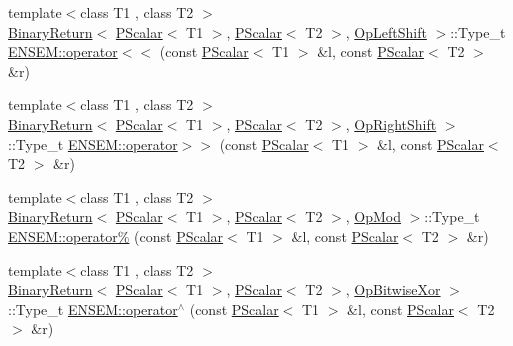 \begin{DoxyCompactItemize}
\item 
{\footnotesize template$<$class T1 , class T2 $>$ }\\\mbox{\hyperlink{structENSEM_1_1BinaryReturn}{Binary\+Return}}$<$ \mbox{\hyperlink{classENSEM_1_1PScalar}{P\+Scalar}}$<$ T1 $>$, \mbox{\hyperlink{classENSEM_1_1PScalar}{P\+Scalar}}$<$ T2 $>$, \mbox{\hyperlink{structENSEM_1_1OpLeftShift}{Op\+Left\+Shift}} $>$\+::Type\+\_\+t \mbox{\hyperlink{group__primscalar_ga39d346ef6c678a5a37348a5a403e955d}{E\+N\+S\+E\+M\+::operator$<$$<$}} (const \mbox{\hyperlink{classENSEM_1_1PScalar}{P\+Scalar}}$<$ T1 $>$ \&l, const \mbox{\hyperlink{classENSEM_1_1PScalar}{P\+Scalar}}$<$ T2 $>$ \&r)
\item 
{\footnotesize template$<$class T1 , class T2 $>$ }\\\mbox{\hyperlink{structENSEM_1_1BinaryReturn}{Binary\+Return}}$<$ \mbox{\hyperlink{classENSEM_1_1PScalar}{P\+Scalar}}$<$ T1 $>$, \mbox{\hyperlink{classENSEM_1_1PScalar}{P\+Scalar}}$<$ T2 $>$, \mbox{\hyperlink{structENSEM_1_1OpRightShift}{Op\+Right\+Shift}} $>$\+::Type\+\_\+t \mbox{\hyperlink{group__primscalar_ga85954268175e1f847049ff341c964518}{E\+N\+S\+E\+M\+::operator$>$$>$}} (const \mbox{\hyperlink{classENSEM_1_1PScalar}{P\+Scalar}}$<$ T1 $>$ \&l, const \mbox{\hyperlink{classENSEM_1_1PScalar}{P\+Scalar}}$<$ T2 $>$ \&r)
\item 
{\footnotesize template$<$class T1 , class T2 $>$ }\\\mbox{\hyperlink{structENSEM_1_1BinaryReturn}{Binary\+Return}}$<$ \mbox{\hyperlink{classENSEM_1_1PScalar}{P\+Scalar}}$<$ T1 $>$, \mbox{\hyperlink{classENSEM_1_1PScalar}{P\+Scalar}}$<$ T2 $>$, \mbox{\hyperlink{structENSEM_1_1OpMod}{Op\+Mod}} $>$\+::Type\+\_\+t \mbox{\hyperlink{group__primscalar_ga628b45b47db0fad40e96f41b255fe161}{E\+N\+S\+E\+M\+::operator\%}} (const \mbox{\hyperlink{classENSEM_1_1PScalar}{P\+Scalar}}$<$ T1 $>$ \&l, const \mbox{\hyperlink{classENSEM_1_1PScalar}{P\+Scalar}}$<$ T2 $>$ \&r)
\item 
{\footnotesize template$<$class T1 , class T2 $>$ }\\\mbox{\hyperlink{structENSEM_1_1BinaryReturn}{Binary\+Return}}$<$ \mbox{\hyperlink{classENSEM_1_1PScalar}{P\+Scalar}}$<$ T1 $>$, \mbox{\hyperlink{classENSEM_1_1PScalar}{P\+Scalar}}$<$ T2 $>$, \mbox{\hyperlink{structENSEM_1_1OpBitwiseXor}{Op\+Bitwise\+Xor}} $>$\+::Type\+\_\+t \mbox{\hyperlink{group__primscalar_ga86ae67deb84332c9b2cadb6d1f7149f2}{E\+N\+S\+E\+M\+::operator$^\wedge$}} (const \mbox{\hyperlink{classENSEM_1_1PScalar}{P\+Scalar}}$<$ T1 $>$ \&l, const \mbox{\hyperlink{classENSEM_1_1PScalar}{P\+Scalar}}$<$ T2 $>$ \&r)

\end{DoxyCompactItemize}
